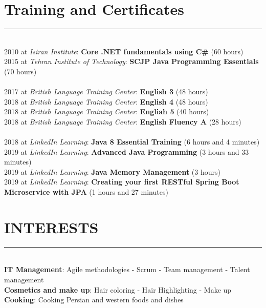\documentclass[10pt,a4paper]{article}
\begin{document}
\section{Training and Certificates}
\noindent \rule {18.0cm}{0.2pt} \\
\textbullet \hspace{0.1cm} 2010 at \textit{Isiran Institute}: \textbf{Core .NET fundamentals using C\#} (60 hours) \\
\textbullet \hspace{0.1cm} 2015 at \textit{Tehran Institute of Technology}: \textbf{SCJP Java Programming Essentials} (70 hours) \\ \\
\textbullet \hspace{0.1cm} 2017 at \textit{British Language Training Center}: \textbf{English 3} (48 hours) \\
\textbullet \hspace{0.1cm} 2018 at \textit{British Language Training Center}: \textbf{English 4} (48 hours) \\
\textbullet \hspace{0.1cm} 2018 at \textit{British Language Training Center}: \textbf{Engliah 5} (40 hours) \\
\textbullet \hspace{0.1cm} 2018 at \textit{British Language Training Center}: \textbf{English Fluency A} (28 hours) \\ \\
\textbullet \hspace{0.1cm}  2018 at \textit{LinkedIn Learning}: \textbf{Java 8 Essential Training} (6 hours and 4 minutes) \\
\textbullet \hspace{0.1cm}  2019 at \textit{LinkedIn Learning}: \textbf{Advanced Java Programming} (3 hours and 33 minutes) \\
\textbullet \hspace{0.1cm}  2019 at \textit{LinkedIn Learning}: \textbf{Java Memory Management} (3 hours) \\
\textbullet \hspace{0.1cm}  2019 at \textit{LinkedIn Learning}: \textbf{Creating your first RESTful Spring Boot Microservice with JPA} (1 hours and 27 minutes) \\

\section{INTERESTS}
\noindent \rule {18.0cm}{0.2pt} \\
\textbullet \hspace{0.1cm} \textbf{IT Management}: Agile methodologies - Scrum - Team management - Talent management \\
\textbullet \hspace{0.1cm} \textbf{Cosmetics and make up}: Hair coloring - Hair Highlighting - Make up \\
\textbullet \hspace{0.1cm} \textbf{Cooking}: Cooking Persian and western foods and dishes \\
\end{document}
